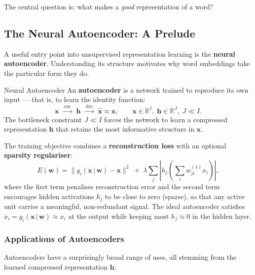 \documentclass[11pt,a4paper]{article}
\newcommand{\term}[1]{\textcolor{DefGreen}{\textbf{#1}}}
\begin{document}
The central question is: what makes a \emph{good} representation of a word?

\subsection{The Neural Autoencoder: A Prelude}
\label{sec:autoencoder}

A useful entry point into unsupervised representation learning is the \term{neural autoencoder}. Understanding its structure motivates why word embeddings take the particular form they do.

\begin{defbox}{Neural Autoencoder}
An \term{autoencoder} is a network trained to reproduce its own input — that is, to learn the identity function:
\[
  \mathbf{x} \;\xrightarrow{\;\text{enc}\;}\; \mathbf{h} \;\xrightarrow{\;\text{dec}\;}\; \hat{\mathbf{x}} \approx \mathbf{x},
  \qquad \mathbf{x} \in \mathbb{R}^I,\; \mathbf{h} \in \mathbb{R}^J,\; J \ll I.
\]
The bottleneck constraint $J \ll I$ forces the network to learn a compressed representation $\mathbf{h}$ that retains the most informative structure in $\mathbf{x}$.
\end{defbox}

The training objective combines a \textbf{reconstruction loss} with an optional \textbf{sparsity regulariser}:
\[
  E(\mathbf{w}) = \bigl\|g_i(\mathbf{x}\,|\,\mathbf{w}) - \mathbf{x}\bigr\|^2
  \;+\; \lambda \sum_{j} \left| h_j\!\left(\sum_i w_{ji}^{(1)} x_i\right) \right|,
\]
where the first term penalises reconstruction error and the second term encourages hidden activations $h_j$ to be close to zero (sparse), so that any active unit carries a meaningful, non-redundant signal. The ideal autoencoder satisfies $\hat{x}_i = g_i(\mathbf{x}\,|\,\mathbf{w}) \approx x_i$ at the output while keeping most $h_j \approx 0$ in the hidden layer.

\subsubsection{Applications of Autoencoders}

Autoencoders have a surprisingly broad range of uses, all stemming from the learned compressed representation $\mathbf{h}$:
\end{document}

